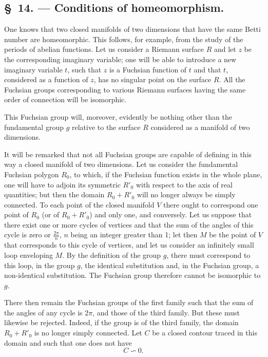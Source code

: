 \documentclass{article}
\begin{document}
\subsection*{\S~14. --- Conditions of homeomorphism.}

One knows that two closed manifolds of two dimensions that have the same Betti number are homeomorphic. This follows, for example, from the study of the periods of abelian functions. Let us consider a Riemann surface $R$ and let $z$ be the corresponding imaginary variable; one will be able to introduce a new imaginary variable $t$, such that $z$ is a Fuchsian function of $t$ and that $t$, considered as a function of $z$, has no singular point on the surface $R$. All the Fuchsian groups corresponding to various Riemann surfaces having the same order of connection will be isomorphic.

This Fuchsian group will, moreover, evidently be nothing other than the fundamental group $g$ relative to the surface $R$ considered as a manifold of two dimensions.

It will be remarked that not all Fuchsian groups are capable of defining in this way a closed manifold of two dimensions. Let us consider the fundamental Fuchsian polygon $R_{0}$, to which, if the Fuchsian function exists in the whole plane, one will have to adjoin its symmetric $R'_{0}$ with respect to the axis of real quantities; but then the domain $R_{0} + R'_{0}$ will no longer always be simply connected. To each point of the closed manifold $V$ there ought to correspond one point of $R_{0}$ (or of $R_{0} + R'_{0}$) and only one, and conversely. Let us suppose that there exist one or more cycles of vertices and that the sum of the angles of this cycle is zero or $\frac{2\pi}{n}$, $n$ being an integer greater than 1; let then $M$ be the point of $V$ that corresponds to this cycle of vertices, and let us consider an infinitely small loop enveloping $M$. By the definition of the group $g$, there must correspond to this loop, in the group $g$, the identical substitution and, in the Fuchsian group, a non-identical substitution. The Fuchsian group therefore cannot be isomorphic to $g$.

There then remain the Fuchsian groups of the first family such that the sum of the angles of any cycle is $2\pi$, and those of the third family. But these must likewise be rejected. Indeed, if the group is of the third family, the domain $R_{0} + R'_{0}$ is no longer simply
connected. Let $C$ be a closed contour traced in this domain and such that one does not have
\[ C \backsim 0. \]
\end{document}
